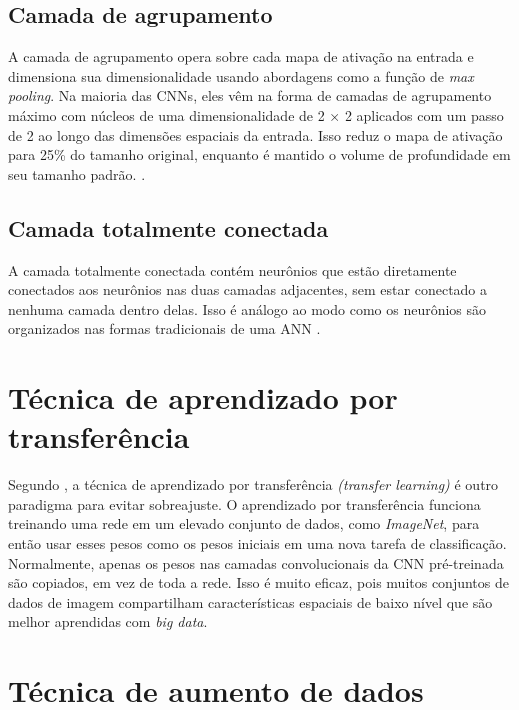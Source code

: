 \documentclass[
	12pt,				%
	oneside,			%
	a4paper,			%
	english,			%
	brazil				%
	]{abntex2ppgsi}
\begin{document}
\subsection{Camada de agrupamento}

A camada de agrupamento opera sobre cada mapa de ativação na entrada e dimensiona sua dimensionalidade usando abordagens como a função de \textit{max pooling}. Na maioria das CNNs, eles vêm na forma de camadas de agrupamento máximo com núcleos de uma dimensionalidade de 2 × 2 aplicados com um passo de 2 ao longo das dimensões espaciais da entrada. Isso reduz o mapa de ativação para 25\% do tamanho original, enquanto é mantido o volume de profundidade em seu tamanho padrão. \cite{o2015introduction}.

\subsection{Camada totalmente conectada}

A camada totalmente conectada contém neurônios que estão diretamente conectados aos neurônios nas duas camadas adjacentes, sem estar conectado a nenhuma camada dentro delas. Isso é análogo ao modo como os neurônios são organizados nas formas tradicionais de uma ANN \cite{o2015introduction}.

\section{Técnica de aprendizado por transferência}

Segundo , a técnica de aprendizado por transferência \textit{(transfer learning)} é outro paradigma para evitar sobreajuste. O aprendizado por transferência funciona treinando uma rede em um elevado conjunto de dados, como \textit{ImageNet}, para então usar esses pesos como os pesos iniciais em uma nova tarefa de classificação. Normalmente, apenas os pesos nas camadas convolucionais da CNN pré-treinada são copiados, em vez de toda a rede. Isso é muito eficaz, pois muitos conjuntos de dados de imagem compartilham características espaciais de baixo nível que são melhor aprendidas com \textit{big data}.

\section{Técnica de aumento de dados}
\end{document}
